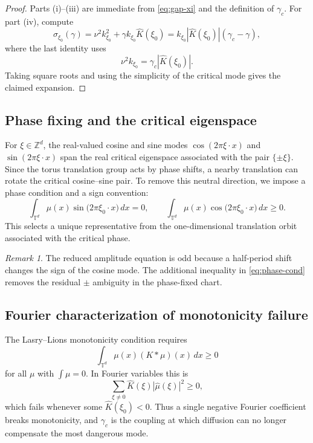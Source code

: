 \documentclass[11pt]{amsart}
\theoremstyle{definition}
\theoremstyle{remark}
\newtheorem{remark}[theorem]{Remark}
\newcommand{\Td}{\mathbb{T}^d}
\newcommand{\Zd}{\mathbb{Z}^d}
\newcommand{\Kh}{\widehat{K}}
\newcommand{\gamc}{\gamma_c}
\begin{document}
\begin{proof}
Parts (i)--(iii) are immediate from \eqref{eq:gap-xi} and the definition of $\gamc$.
For part (iv), compute
\[
\sigma_{\xi_0}(\gamma)
= \nu^2k_{\xi_0}^2 + \gamma k_{\xi_0}\Kh(\xi_0)
= k_{\xi_0}|\Kh(\xi_0)|(\gamc - \gamma),
\]
where the last identity uses
\[
\nu^2k_{\xi_0}=\gamc|\Kh(\xi_0)|.
\]
Taking square roots and using the simplicity of the critical mode gives the claimed expansion.
\end{proof}

\subsection{Phase fixing and the critical eigenspace}
\label{sub:phase-fixing}

For $\xi\in\Zd$, the real-valued cosine and sine modes $\cos(2\pi\xi\cdot x)$ and $\sin(2\pi\xi\cdot x)$ span the real critical eigenspace associated with the pair $\{\pm\xi\}$. Since the torus translation group acts by phase shifts, a nearby translation can rotate the critical cosine--sine pair. To remove this neutral direction, we impose a phase condition and a sign convention:
\begin{equation}
\label{eq:phase-cond}
\int_{\Td}\mu(x)\sin\!\bigl(2\pi\xi_0\cdot x\bigr)\,dx=0,
\qquad
\int_{\Td}\mu(x)\cos\!\bigl(2\pi\xi_0\cdot x\bigr)\,dx\ge 0.
\end{equation}
This selects a unique representative from the one-dimensional translation orbit associated with the critical phase.

\begin{remark}
The reduced amplitude equation is odd because a half-period shift changes the sign of the cosine mode. The additional inequality in \eqref{eq:phase-cond} removes the residual $\pm$ ambiguity in the phase-fixed chart.
\end{remark}

\subsection{Fourier characterization of monotonicity failure}
\label{sub:monotonicity}

The Lasry--Lions monotonicity condition requires
\[
\int_{\Td}\mu(x)(K*\mu)(x)\,dx\ge 0
\]
for all $\mu$ with $\int\mu=0$. In Fourier variables this is
\[
\sum_{\xi\neq 0}\Kh(\xi)|\widehat\mu(\xi)|^2\ge 0,
\]
which fails whenever some $\Kh(\xi_0)<0$. Thus a single negative Fourier coefficient breaks monotonicity, and $\gamc$ is the coupling at which diffusion can no longer compensate the most dangerous mode.
\end{document}
